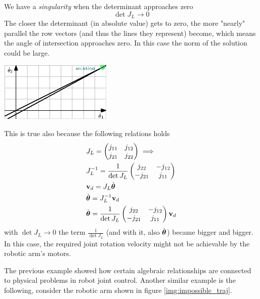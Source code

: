 \documentclass[10pt, letterpaper]{report}
\begin{document}
We have a \textit{singularity} when the determinant approaches zero\begin{equation}
    \det J_L\rightarrow 0
\end{equation}
The closer the determinant (in absolute value) gets to zero, the more "nearly" parallel the row vectors (and thus the lines they represent) become, which means the angle of intersection approaches zero. In this case the norm of the solution could be large.
\begin{center}
    \includegraphics[width=0.4\textwidth ]{images/singularity.eps} 
\end{center}
This is true also because the following relations holds
\begin{align}
    &J_L=\begin{pmatrix}
        j_{11}&j_{12}\\
         j_{21}&j_{22}
    \end{pmatrix}\implies\\ &J_L^{-1}=\frac{1}{\det J_L}\begin{pmatrix}
        j_{22}&-j_{12}\\
         -j_{21}&j_{11}
    \end{pmatrix}\\
    &\mathbf v_d=J_L\dot{{\boldsymbol{\theta}}}\\
    &\dot{{\boldsymbol{\theta}}}=J_L^{-1}\mathbf v_d\\
      &\dot{{\boldsymbol{\theta}}}=\frac{1}{\det J_L}\begin{pmatrix}
        j_{22}&-j_{12}\\
         -j_{21}&j_{11}
    \end{pmatrix}\mathbf v_d
\end{align}
with $\det J_L\rightarrow 0$ the term $\frac{1}{\det J_L}$ (and with it, also $\dot{{\boldsymbol{\theta}}}$) became bigger and bigger. In this case, the required joint rotation velocity might not be achievable by the robotic arm's motors.\bigskip

The previous example showed how certain algebraic relationships are connected to physical problems in robot joint control. Another similar example is the following, consider the robotic arm shown in figure \ref{img:impossible_traj}.
\end{document}
